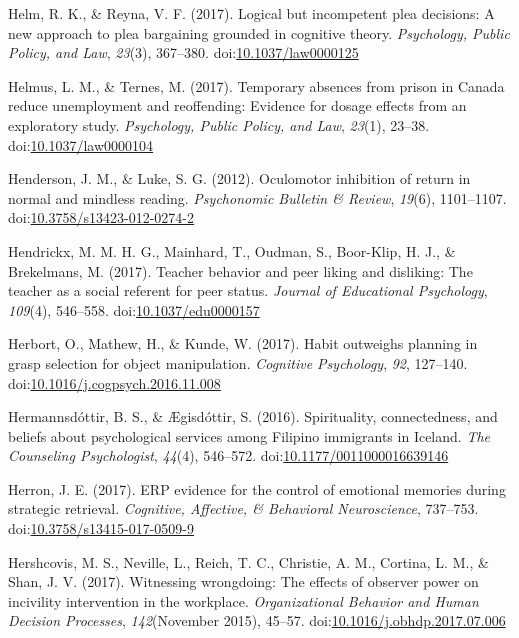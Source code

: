 \documentclass[english,man]{apa6}
\theoremstyle{definition}
\theoremstyle{definition}
\theoremstyle{definition}
\theoremstyle{remark}
\begin{document}
\hypertarget{ref-Helm2017}{}
Helm, R. K., \& Reyna, V. F. (2017). Logical but incompetent plea
decisions: A new approach to plea bargaining grounded in cognitive
theory. \emph{Psychology, Public Policy, and Law}, \emph{23}(3),
367--380.
doi:\href{https://doi.org/10.1037/law0000125}{10.1037/law0000125}

\hypertarget{ref-Helmus2017}{}
Helmus, L. M., \& Ternes, M. (2017). Temporary absences from prison in
Canada reduce unemployment and reoffending: Evidence for dosage effects
from an exploratory study. \emph{Psychology, Public Policy, and Law},
\emph{23}(1), 23--38.
doi:\href{https://doi.org/10.1037/law0000104}{10.1037/law0000104}

\hypertarget{ref-Henderson2012}{}
Henderson, J. M., \& Luke, S. G. (2012). Oculomotor inhibition of return
in normal and mindless reading. \emph{Psychonomic Bulletin \& Review},
\emph{19}(6), 1101--1107.
doi:\href{https://doi.org/10.3758/s13423-012-0274-2}{10.3758/s13423-012-0274-2}

\hypertarget{ref-Hendrickx2017}{}
Hendrickx, M. M. H. G., Mainhard, T., Oudman, S., Boor-Klip, H. J., \&
Brekelmans, M. (2017). Teacher behavior and peer liking and disliking:
The teacher as a social referent for peer status. \emph{Journal of
Educational Psychology}, \emph{109}(4), 546--558.
doi:\href{https://doi.org/10.1037/edu0000157}{10.1037/edu0000157}

\hypertarget{ref-Herbort2017}{}
Herbort, O., Mathew, H., \& Kunde, W. (2017). Habit outweighs planning
in grasp selection for object manipulation. \emph{Cognitive Psychology},
\emph{92}, 127--140.
doi:\href{https://doi.org/10.1016/j.cogpsych.2016.11.008}{10.1016/j.cogpsych.2016.11.008}

\hypertarget{ref-Hermannsdottir2016}{}
Hermannsdóttir, B. S., \& Ægisdóttir, S. (2016). Spirituality,
connectedness, and beliefs about psychological services among Filipino
immigrants in Iceland. \emph{The Counseling Psychologist}, \emph{44}(4),
546--572.
doi:\href{https://doi.org/10.1177/0011000016639146}{10.1177/0011000016639146}

\hypertarget{ref-Herron2017}{}
Herron, J. E. (2017). ERP evidence for the control of emotional memories
during strategic retrieval. \emph{Cognitive, Affective, \& Behavioral
Neuroscience}, 737--753.
doi:\href{https://doi.org/10.3758/s13415-017-0509-9}{10.3758/s13415-017-0509-9}

\hypertarget{ref-Hershcovis2017}{}
Hershcovis, M. S., Neville, L., Reich, T. C., Christie, A. M., Cortina,
L. M., \& Shan, J. V. (2017). Witnessing wrongdoing: The effects of
observer power on incivility intervention in the workplace.
\emph{Organizational Behavior and Human Decision Processes},
\emph{142}(November 2015), 45--57.
doi:\href{https://doi.org/10.1016/j.obhdp.2017.07.006}{10.1016/j.obhdp.2017.07.006}
\end{document}
